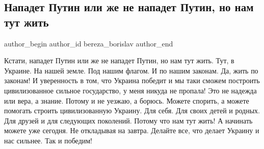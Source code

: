  
 
 
 
 
 
\subsection{Нападет Путин или же не нападет Путин, но нам тут жить}
\label{sec:19_01_2022.fb.bereza_borislav.1.nam_tut_zhit}
 
\ifcmt
 author_begin
   author_id bereza_borislav
 author_end
\fi

Кстати, нападет Путин или же не нападет Путин, но нам тут жить. Тут, в Украине.
На нашей земле. Под нашим флагом. И по нашим законам. Да, жить по законам! И
уверенность в том, что Украина победит и мы таки сможем построить
цивилизованное сильное государство, у меня никуда не пропала! Это не надежда
или вера, а знание. Потому и не уезжаю, а борюсь. Можете спорить, а можете
помогать строить цивилизованную Украину. Для себя. Для своих детей и родных.
Для друзей и для следующих поколений. Потому что нам тут жить!  А начинать
можете уже сегодня. Не откладывая на завтра. Делайте все, что делает Украину и
нас сильнее. Так и победим!

